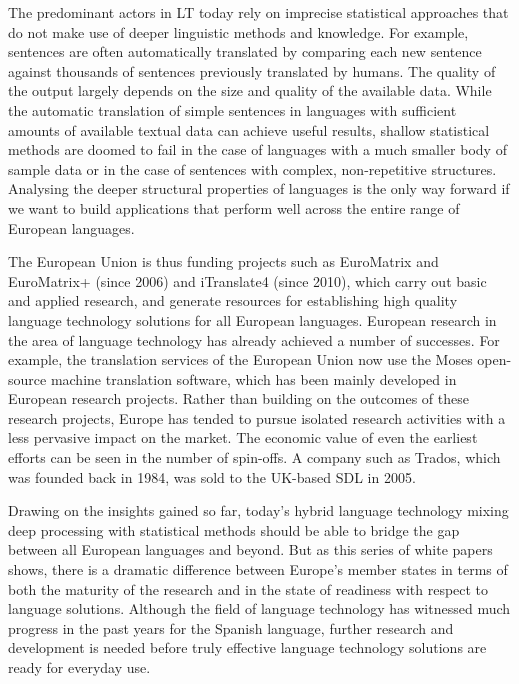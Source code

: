 \begin{multicols}{2}
The predominant actors in LT today rely on imprecise statistical approaches that do not make use of deeper linguistic methods and knowledge. For example, sentences are often automatically translated by comparing each new sentence against thousands of sentences previously translated by humans. The quality of the output largely depends on the size and quality of the available data. While the automatic translation of simple sentences in languages with sufficient amounts of available textual data can achieve useful results, shallow statistical methods are doomed to fail in the case of languages with a much smaller body of sample data or in the case of sentences with complex, non-repetitive structures. Analysing the deeper structural properties of languages is the only way forward if we want to build applications that perform well across the entire range of European languages.


The European Union is thus funding projects such as EuroMatrix and EuroMatrix+ (since 2006) and iTranslate4 (since 2010), which carry out basic and applied research, and generate resources for establishing high quality language technology solutions for all European languages. 
European research in the area of language technology has already achieved a number of successes. For example, the translation services of the European Union now use the Moses open-source machine translation software, which has been mainly developed in European research projects. Rather than building on the outcomes of these research projects, Europe has tended to pursue isolated research activities with a less pervasive impact on the market. The economic value of even the earliest efforts can be seen in the number of spin-offs. A company such as Trados, which was founded back in 1984, was sold to the UK-based SDL in 2005.


Drawing on the insights gained so far, today’s hybrid language technology mixing deep processing with statistical methods should be able to bridge the gap between all European languages and beyond. But as this series of white papers shows, there is a dramatic difference between Europe’s member states in terms of both the maturity of the research and in the state of readiness with respect to language solutions. Although the field of language technology has witnessed much progress in the past years for the Spanish language, further research and development is needed before truly effective language technology solutions are ready for everyday use. 


\end{multicols}
